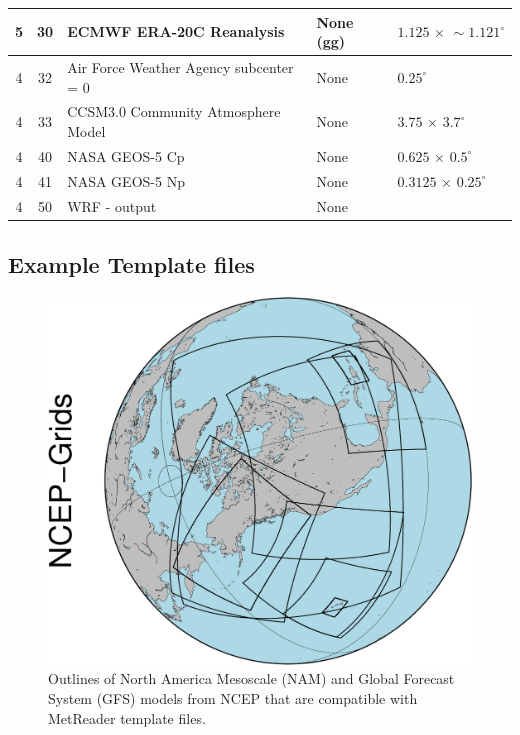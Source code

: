 \documentclass[11pt]{article}   %
\begin{document}
\begin{table}[h]
\begin{tabular}{| c | c | l | l | l |}
5 &  30 & ECMWF ERA-20C Reanalysis & None (gg) & $1.125 \, \times \, \sim 1.121^{\circ}$\\
  \hline
4 &  32 & Air Force Weather Agency subcenter = 0 & None & $0.25^{\circ}$ \\
4 &  33 & CCSM3.0 Community Atmosphere Model &None & $3.75 \, \times \,3.7^{\circ}$\\
  \hline
4 &  40 & NASA GEOS-5 Cp & None & $0.625 \, \times \,0.5^{\circ}$ \\
4 &  41 & NASA GEOS-5 Np & None & $0.3125 \, \times \,0.25^{\circ}$\\
4 &  50 & WRF - output & None & \\
\hline
\end{tabular}
\end{table}
\normalsize
\clearpage
\subsection{Example Template files}\label{ApTemplate}
\begin{figure}[htbp]\begin{center}
 \includegraphics[angle=-90,scale=0.7]{Figs/Overview_NCEP-Grids.pdf}
\parbox{15cm}{\caption{\label{FigNAMs}
Outlines of North America Mesoscale (NAM) and Global Forecast System (GFS)
models from NCEP that are compatible with MetReader template files.
}}
\end{center}\end{figure}
\end{document}
